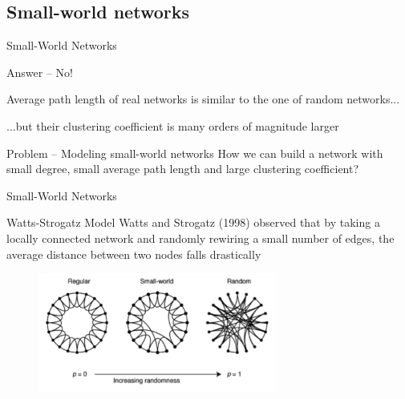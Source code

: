 \subsection{Small-world networks}

\begin{frame}{Small-World Networks}

\begin{block}{Answer -- No!}
\BI
\item Average path length of real networks is similar to the one of random networks...
\item ...but their clustering coefficient is many orders of magnitude larger
\EI
\end{block}

\bigskip
\begin{block}{Problem -- Modeling \alert{small-world} networks}
How we can build a network with \alert{small degree}, \alert{small
average path length} and \alert{large clustering coefficient}?
\end{block}

\end{frame}

\begin{frame}{Small-World Networks}

\begin{block}{Watts-Strogatz Model}
Watts and Strogatz (1998) observed that by taking a locally connected 
network and randomly rewiring a small number of edges, the average distance 
between two nodes falls drastically
\end{block}

\begin{figure}
	\includegraphics[width=0.7\textwidth]{figs/08/watts}
\end{figure}

\end{frame}

